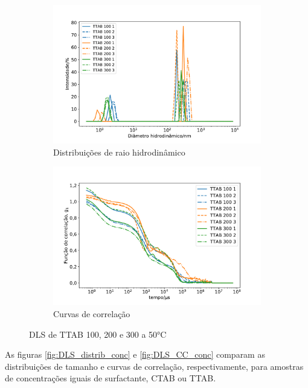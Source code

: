 \begin{figure}[H]
	\begin{subfigure}{0.47\textwidth}
		\centering
		\includegraphics[width=\textwidth]{imagens/dls/ttab_distrib}
		\caption{Distribuições de raio hidrodinâmico}
		\label{fig:DLS_ttab_distrib}
	\end{subfigure} \qquad %
	\begin{subfigure}{0.47\textwidth}
		\centering
		\includegraphics[width=\textwidth]{imagens/dls/ttab_CC}
		\caption{Curvas de correlação}
		\label{fig:DLS_ttab_cc}
	\end{subfigure}
	\caption{DLS de TTAB 100, 200 e 300 \mM{} a 50°C}
	\label{fig:DLS_ttab}
\end{figure}

	As figuras \ref{fig:DLS_distrib_conc} e \ref{fig:DLS_CC_conc} comparam as distribuições de tamanho e curvas de correlação, respectivamente, para amostras de concentrações iguais de surfactante, CTAB ou TTAB.

